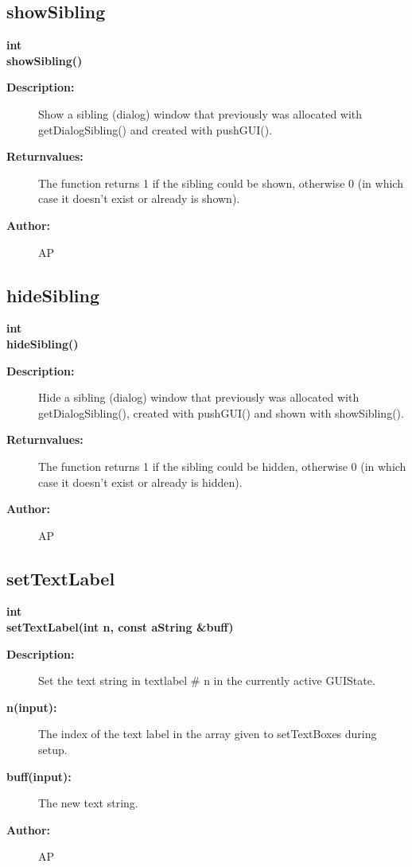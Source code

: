 \subsection{showSibling}
 
\begin{flushleft} \textbf{%
int  \\ 
\settowidth{\DialogDataIncludeArgIndent}{showSibling(}%
showSibling()
}\end{flushleft}
\begin{description}
\item[{\bf Description:}]  Show a sibling (dialog) window that previously was allocated with 
 getDialogSibling() and created with pushGUI().

\item[{\bf Returnvalues:}]  The function returns 1 if the sibling could be shown, otherwise 0 
 (in which case it doesn't exist or already is shown).
\item[{\bf Author:}]  AP
\end{description}
\subsection{hideSibling}
 
\begin{flushleft} \textbf{%
int  \\ 
\settowidth{\DialogDataIncludeArgIndent}{hideSibling(}%
hideSibling() 
}\end{flushleft}
\begin{description}
\item[{\bf Description:}]  Hide a sibling (dialog) window that previously was allocated with 
 getDialogSibling(), created with pushGUI() and shown with showSibling().

\item[{\bf Returnvalues:}]  The function returns 1 if the sibling could be hidden, otherwise 0 
 (in which case it doesn't exist or already is hidden).
\item[{\bf Author:}]  AP
\end{description}
\subsection{setTextLabel}
 
\begin{flushleft} \textbf{%
int  \\ 
\settowidth{\DialogDataIncludeArgIndent}{setTextLabel(}%
setTextLabel(int n, const aString \&buff)
}\end{flushleft}
\begin{description}
\item[{\bf Description:}]  Set the text string in textlabel \# n in the currently
 active GUIState.

\item[{\bf n(input):}]  The index of the text label in the array given to setTextBoxes during setup.
\item[{\bf buff(input):}]  The new text string.

\item[{\bf Author:}]  AP
\end{description}
